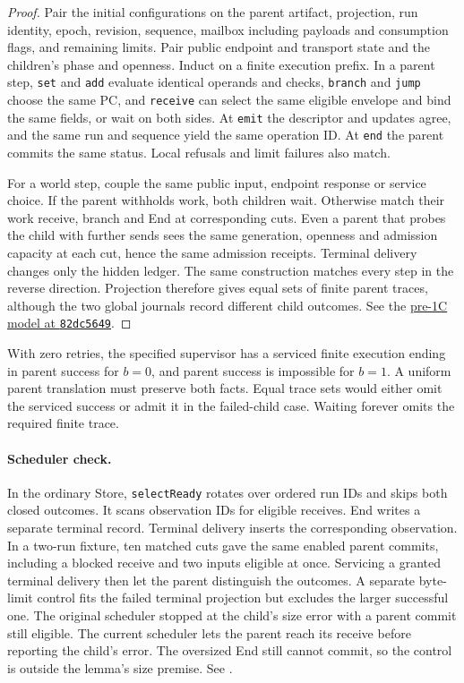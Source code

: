 \documentclass[11pt,a4paper]{article}
\theoremstyle{definition}
\theoremstyle{remark}
\begin{document}
\begin{proof}
Pair the initial configurations on the parent artifact, projection, run identity, epoch, revision, sequence, mailbox including payloads and consumption flags, and remaining limits. Pair public endpoint and transport state and the children's phase and openness. Induct on a finite execution prefix. In a parent step, \texttt{set} and \texttt{add} evaluate identical operands and checks, \texttt{branch} and \texttt{jump} choose the same PC, and \texttt{receive} can select the same eligible envelope and bind the same fields, or wait on both sides. At \texttt{emit} the descriptor and updates agree, and the same run and sequence yield the same operation ID. At \texttt{end} the parent commits the same status. Local refusals and limit failures also match.

For a world step, couple the same public input, endpoint response or service choice. If the parent withholds work, both children wait. Otherwise match their work receive, branch and End at corresponding cuts. Even a parent that probes the child with further sends sees the same generation, openness and admission capacity at each cut, hence the same admission receipts. Terminal delivery changes only the hidden ledger. The same construction matches every step in the reverse direction. Projection therefore gives equal sets of finite parent traces, although the two global journals record different child outcomes. See the \href{https://github.com/JakeFAU/alan/blob/82dc5649cfe0eccb2fde3ecea1e12cc851377af5/research/semantics/model_test.go}{pre-1C model at \texttt{82dc5649}}.
\end{proof}

With zero retries, the specified supervisor has a serviced finite execution ending in parent success for $b=0$, and parent success is impossible for $b=1$. A uniform parent translation must preserve both facts. Equal trace sets would either omit the serviced success or admit it in the failed-child case. Waiting forever omits the required finite trace.

\paragraph{Scheduler check.} In the ordinary Store, \texttt{selectReady} rotates over ordered run IDs and skips both closed outcomes. It scans observation IDs for eligible receives. End writes a separate terminal record. Terminal delivery inserts the corresponding observation. In a two-run fixture, ten matched cuts gave the same enabled parent commits, including a blocked receive and two inputs eligible at once. Servicing a granted terminal delivery then let the parent distinguish the outcomes. A separate byte-limit control fits the failed terminal projection but excludes the larger successful one. The original scheduler stopped at the child's size error with a parent commit still eligible. The current scheduler lets the parent reach its receive before reporting the child's error. The oversized End still cannot commit, so the control is outside the lemma's size premise. See .
\end{document}
